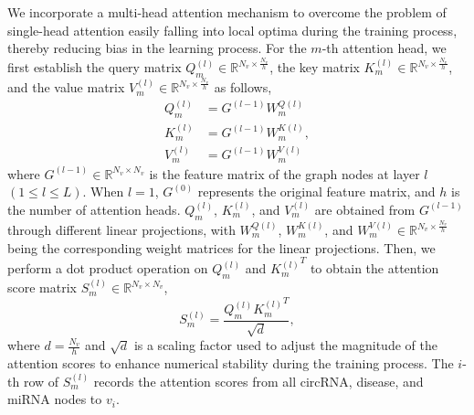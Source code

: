 \documentclass[journal=jcisd8,manuscript=article]{achemso}
\begin{document}
We incorporate a multi-head attention mechanism to overcome the problem of single-head attention easily falling into local optima during the training process, thereby reducing bias in the learning process. For the $m$-th attention head, we first establish the query matrix $Q_{m}^{(l)} \in \mathbb{R}^{N_v \times \frac{N_v}{h}}$, the key matrix $K_{m}^{(l)} \in \mathbb{R}^{N_v \times \frac{N_v}{h}}$, and the value matrix $V_{m}^{(l)} \in \mathbb{R}^{N_v \times \frac{N_v}{h}}$ as follows,
\begin{equation}
	\begin{aligned}
		{Q_{m}^{(l)}} &= G^{{(l - 1)}}{W_{m}^{Q{(l)}}} \\
		{K_{m}^{(l)}} &= G^{{(l - 1)}}{W_{m}^{K{(l)}}} ,\\
		{V_{m}^{(l)}} &= G^{(l - 1)}{W_{m}^{V{(l)}}}
	\end{aligned}
\end{equation}
where $G^{(l - 1)} \in \mathbb{R}^{N_v \times N_v}$ is the feature matrix of the graph nodes at layer $l$ $(1 \leqslant l \leqslant L)$. When $l = 1$, $G^{(0)}$ represents the original feature matrix, and $h$ is the number of attention heads. $Q_{m}^{(l)}$, $K_{m}^{(l)}$, and $V_{m}^{(l)}$ are obtained from $G^{(l - 1)}$ through different linear projections, with $W_{m}^{Q{(l)}}$, $W_{m}^{K{(l)}}$, and $W_{m}^{V(l)} \in \mathbb{R}^{N_v \times \frac{N_v}{h}}$ being the corresponding weight matrices for the linear projections. Then, we perform a dot product operation on $Q_{m}^{(l)}$ and ${K_{m}^{(l)}}^T$ to obtain the attention score matrix ${S_{m}^{(l)}} \in \mathbb{R}^{N_v \times N_v}$,
\begin{equation}
	{S_{m}^{(l)}} = \frac{Q_{m}^{(l)}{K_{m}^{(l)}}^T}{\sqrt{d}},
\end{equation}
where $d = \frac{N_v}{h}$ and $\sqrt{d}$ is a scaling factor used to adjust the magnitude of the attention scores to enhance numerical stability during the training process. The $i$-th row of $S_{m}^{(l)}$ records the attention scores from all circRNA, disease, and miRNA nodes to $v_i$.
\end{document}
